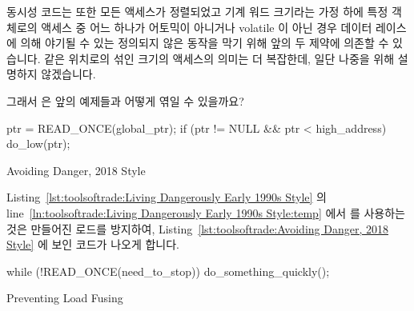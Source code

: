 \fi

동시성 코드는 또한 모든 액세스가 정렬되었고 기계 워드 크기라는 가정 하에 특정
객체로의 액세스 중 어느 하나가 어토믹이 아니거나 volatile 이 아닌 경우 데이터
레이스에 의해 야기될 수 있는 정의되지 않은 동작을 막기 위해 앞의 두 제약에
의존할 수 있습니다.
같은 위치로의 섞인 크기의 액세스의 의미는 더 복잡한데, 일단 나중을 위해
설명하지 않겠습니다.

그래서  은 앞의 예제들과 어떻게 엮일 수 있을까요?

\begin{listing}[tbp]
\begin{fcvlabel}
\begin{VerbatimL}[commandchars=\\\{\}]
ptr = READ_ONCE(global_ptr);
if (ptr != NULL && ptr < high_address)
	do_low(ptr);
\end{VerbatimL}
\end{fcvlabel}
\caption{Avoiding Danger, 2018 Style}
\label{lst:toolsoftrade:Avoiding Danger, 2018 Style}
\end{listing}

Listing~\ref{lst:toolsoftrade:Living Dangerously Early 1990s Style} 의
line~\ref{ln:toolsoftrade:Living Dangerously Early 1990s Style:temp}
에서  를 사용하는 것은 만들어진 로드를 방지하여,
Listing~\ref{lst:toolsoftrade:Avoiding Danger, 2018 Style}
에 보인 코드가 나오게 합니다.

\begin{listing}[tbp]
\begin{fcvlabel}
\begin{VerbatimL}[commandchars=\\\{\}]
while (!READ_ONCE(need_to_stop))
	do_something_quickly();
\end{VerbatimL}
\end{fcvlabel}
\caption{Preventing Load Fusing}
\label{lst:toolsoftrade:Preventing Load Fusing}
\end{listing}

